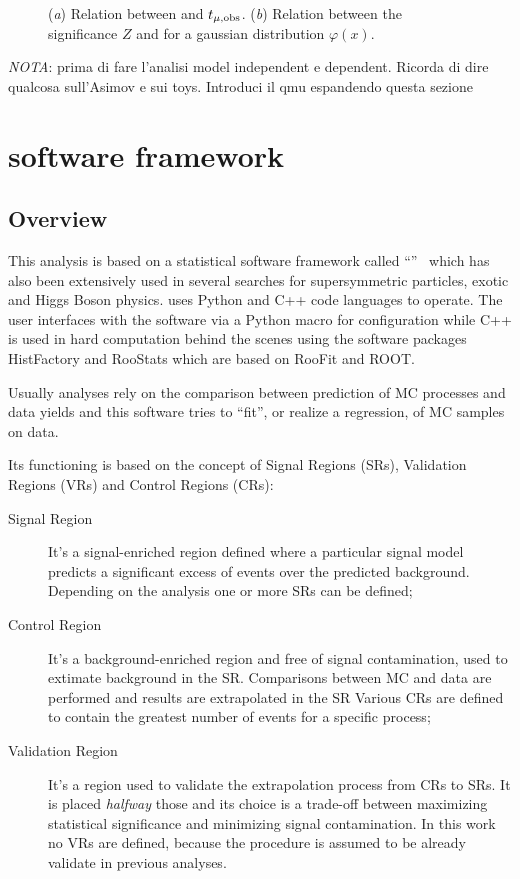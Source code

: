 \begin{figure}[tp]
\centering
{}
\caption{(\emph{a}) Relation between \p and $t_{\mu,\textup{obs}}$. (\emph{b}) Relation between the significance $Z$ and \p for a gaussian distribution $\varphi(x)$.}
\label{pvalue}
\end{figure}

\emph{NOTA}: prima di fare l'analisi model independent e dependent. Ricorda di dire qualcosa sull'Asimov e sui toys. Introduci il qmu espandendo questa sezione 

\section{\hf software framework}

\subsection{Overview}
This analysis is based on a statistical software framework called ``\hf''~\cite{baak:histfitter} which has also been extensively used in several searches for supersymmetric particles, exotic and Higgs Boson physics. 
\hf uses Python and C++ code languages to operate. The user interfaces with the software via a Python macro for configuration while C++ is used in hard computation behind the scenes using the software packages HistFactory and RooStats which are based on RooFit and ROOT.

Usually analyses rely on the comparison between prediction of MC processes and data yields and this software tries to ``fit'', or realize a regression, of MC samples on data. 

Its functioning is based on the concept of Signal Regions (SRs), Validation Regions (VRs) and Control Regions (CRs):
\begin{description}
\item[Signal Region] It's a signal-enriched region defined where a particular signal model predicts a significant excess of events over the predicted background. Depending on the analysis one or more SRs can be defined;
\item[Control Region] It's a background-enriched region and free of signal contamination, used to extimate background in the SR. Comparisons between MC and data are performed and results are extrapolated in the SR Various CRs are defined to contain the greatest number of events for a specific process;
\item[Validation Region] It's a region used to validate the extrapolation process from CRs to SRs. It is placed \emph{halfway} those and its choice is a trade-off between maximizing statistical significance and minimizing signal contamination. In this work no VRs are defined, because the procedure is assumed to be already validate in previous analyses.
\end{description}

